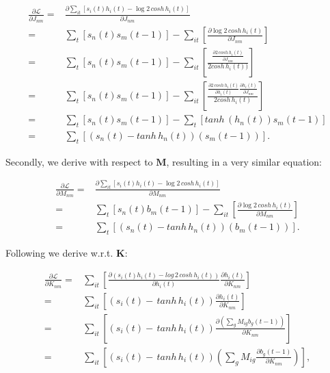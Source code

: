 \documentclass{article}
\def\*#1{\mathbf{#1}}
\begin{document}
\begin{align}
    \frac{\partial\mathcal{L}}{\partial J_{nm}} =& \frac{\partial \sum_{it} \left [ s_{i}(t) h_{i}(t) - \log{ 2 \, cosh \, h_{i}(t)} \right ]}{\partial J_{nm}}
    \\ =& \sum_{t} \left [ s_{n}(t)  s_m(t-1) \right ] - \sum_{it} \left [ \frac{\partial \log{ 2 \, cosh \, h_{i}(t)}}{ \partial J_{nm}} \right ]
    \\ =& \sum_{t} \left [ s_{n}(t) s_m(t-1) \right ] 
    -  \sum_{it} \left [ \frac{\frac{\partial { 2 \, cosh \, h_{i}(t)}}{\partial J_{nm}}}{2 cosh \, h_i(t))} \right ] 
    \\ =& \sum_{t} \left [ s_{n}(t) s_m(t-1) \right ]
    - \sum_{it} \left [  
    \frac{ \frac{ \partial { 2 \, cosh \, h_{i}(t)}}{\partial h_i(t)}\frac{\partial h_i(t)}{\partial J_{nm}}}{
    2 cosh \,h_i(t)}  \right ]
    \\ =& \sum_{t} \left [ s_{n}(t) s_m(t-1)  \right ]
    - \sum_{t} \left [  tanh \,\left ( h_n(t) \right ) s_m(t-1)
    \right ]
    \\ =& \sum_{t} \left [ 
    \left (  s_{n}(t) -  tanh \, h_n(t) \right )
    \left (  s_m(t-1) \right )
    \right ].
\end{align}


Secondly, we derive with respect to $\*M$, resulting in a very similar equation:

\begin{align}
    \frac{\partial\mathcal{L}}{\partial M_{nm}} =& \frac{\partial \sum_{it} \left [ s_{i}(t) h_{i}(t) - \log{ 2 \, cosh \, h_{i}(t)} \right ]}{\partial M_{nm}}
    \\ =& \sum_{t} \left [ s_{n}(t)  b_m(t-1) \right ] - \sum_{it} \left [ \frac{\partial \log{ 2 \, cosh \, h_{i}(t)}}{ \partial M_{nm}} \right ]
    \\ =& \sum_{t} \left [ 
    \left (  s_{n}(t) -  tanh \, h_n(t) \right )\left (  b_m(t-1) \right )
    \right ].
\end{align}

Following we derive w.r.t. $\*K$:

\begin{align}
    \frac{\partial\mathcal{L}}{\partial K_{nm}} =&  \sum_{it} \left [ \frac{ \partial \left ( s_{i}(t) h_{i}(t) - log \, { 2 \, cosh \, h_{i}(t)} \right )}{\partial h_i(t)} \frac{\partial h_i(t)}{\partial K_{nm}} \right ]
    \\ =& \sum_{it} \left [ \left ( s_{i}(t) -  \, tanh \, h_{i}(t) \right ) \frac{\partial h_i(t)}{\partial K_{nm}} \right ]
    \\ =& \sum_{it} \left [ \left ( s_{i}(t) -  \, tanh \, h_{i}(t) \right ) \frac{\partial \left ( \sum_g M_{ig} b_g(t-1) \right ) }{\partial K_{nm}} \right ] 
    \\ =& \sum_{it} \left [ \left ( s_{i}(t) -  \, tanh \, h_{i}(t) \right ) \left ( \sum_g M_{ig} \frac{\partial  b_g(t-1)}{\partial K_{nm}} \right )  \right ],
\end{align}
\end{document}
